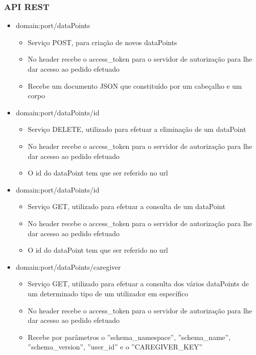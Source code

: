 \subsubsection{API REST}
\begin{itemize}
    \item domain:port/dataPoints
        \begin{itemize}
            \item Serviço POST, para criação de novos dataPoints
            \item No header recebe o access\_token para o servidor de autorização para lhe dar acesso ao pedido efetuado
            \item Recebe um documento JSON que constituído por um cabeçalho e um corpo
        \end{itemize}
    \item domain:port/dataPoints/id
        \begin{itemize}
            \item Serviço DELETE, utilizado para efetuar a eliminação de um dataPoint
            \item No header recebe o access\_token para o servidor de autorização para lhe dar acesso ao pedido efetuado
            \item O id do dataPoint tem que ser referido no url
        \end{itemize}
    \item domain:port/dataPoints/id
        \begin{itemize}
            \item Serviço GET, utilizado para efetuar a consulta de um dataPoint
            \item No header recebe o access\_token para o servidor de autorização para lhe dar acesso ao pedido efetuado
            \item O id do dataPoint tem que ser referido no url
        \end{itemize}
    \item domain:port/dataPoints/caregiver
        \begin{itemize}
            \item Serviço GET, utilizado para efetuar a consulta dos vários dataPoints de um determinado tipo de um utilizador em específico
            \item No header recebe o access\_token para o servidor de autorização para lhe dar acesso ao pedido efetuado
            \item Recebe por parâmetros o ''schema\_namespace'', ''schema\_name'', ''schema\_version'', ''user\_id'' e o ''CAREGIVER\_KEY''
        \end{itemize}
\end{itemize}  

